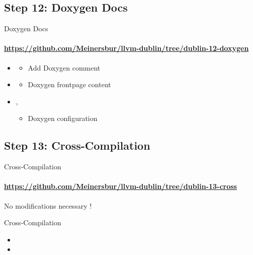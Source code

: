 \subsection{Step 12: Doxygen Docs}
\begin{frame}[fragile]{Doxygen Docs}
\framesubtitle{\url{https://github.com/Meinersbur/llvm-dublin/tree/dublin-12-doxygen}}
\begin{itemize}
\item[\pgfuseimage{file}] 
  \begin{itemize}
  \item Add Doxygen comment
  \end{itemize}
\item[\pgfuseimage{file}] 
  \begin{itemize}
  \item Doxygen frontpage content
  \end{itemize}
\item[\pgfuseimage{file}] , 
  \begin{itemize}
  \item Doxygen configuration
  \end{itemize}
\end{itemize}
\end{frame}



\subsection{Step 13: Cross-Compilation}
\begin{frame}[fragile]{Cross-Compilation}
\framesubtitle{\url{https://github.com/Meinersbur/llvm-dublin/tree/dublin-13-cross}}

No modifications necessary !

\end{frame}




\begin{frame}[fragile,shrink=15]{Cross-Compilation}

\vspace*{12ex}

\begin{itemize}
\item {}
\item {}
\end{itemize}
\end{frame}





